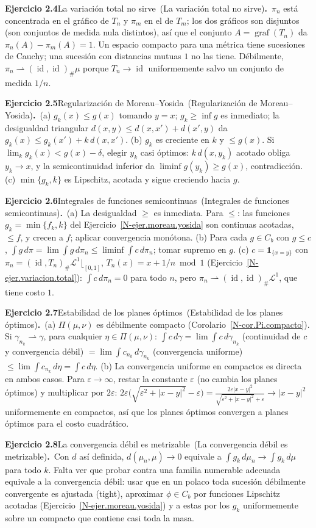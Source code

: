 \documentclass[11pt,a4paper]{amsart}
\newcommand{\id}{\operatorname{id}}
\newcommand{\ve}{\varepsilon}
\newcommand{\LL}{{\mathcal L}}
\newcommand{\I}{{\mathbf 1}}
\theoremstyle{remark}
\theoremstyle{definition}
\numberwithin{subsection}{section}
\numberwithin{equation}{section}
\newcommand{\ejlabel}[2]{\par\medskip\noindent\textbf{Ejercicio #1}\ifx\relax#2\relax\else\ (#2)\fi\textbf{.}\ }
\begin{document}
\ejlabel{2.4}{La variación total no sirve}$\pi_n$ está concentrada en el gráfico de $T_n$ y $\pi_m$ en el de $T_m$; los dos gráficos son disjuntos (son conjuntos de medida nula distintos), así que el conjunto $A=\operatorname{graf}(T_n)$ da $\pi_n(A)-\pi_m(A)=1$. Un espacio compacto para una métrica tiene sucesiones de Cauchy; una sucesión con distancias mutuas $1$ no las tiene. Débilmente, $\pi_n\rightharpoonup(\id,\id)_\#\mu$ porque $T_n\to\id$ uniformemente salvo un conjunto de medida $1/n$.

\ejlabel{2.5}{Regularización de Moreau--Yosida}(a) $g_k(x)\le g(x)$ tomando $y=x$; $g_k\ge\inf g$ es inmediato; la desigualdad triangular $d(x,y)\le d(x,x')+d(x',y)$ da $g_k(x)\le g_k(x')+k\,d(x,x')$. (b) $g_k$ es creciente en $k$ y $\le g(x)$. Si $\lim_kg_k(x)<g(x)-\delta$, elegir $y_k$ casi óptimos: $k\,d(x,y_k)$ acotado obliga $y_k\to x$, y la semicontinuidad inferior da $\liminf g(y_k)\ge g(x)$, contradicción. (c) $\min\{g_k,k\}$ es Lipschitz, acotada y sigue creciendo hacia $g$.

\ejlabel{2.6}{Integrales de funciones semicontinuas}(a) La desigualdad $\ge$ es inmediata. Para $\le$: las funciones $g_k=\min\{f_k,k\}$ del Ejercicio~\ref{N-ejer.moreau.yosida} son continuas acotadas, $\le f$, y crecen a $f$; aplicar convergencia monótona. (b) Para cada $g\in C_b$ con $g\le c$, $\int g\,d\pi=\lim\int g\,d\pi_n\le\liminf\int c\,d\pi_n$; tomar supremo en $g$. (c) $c=\I_{\{x=y\}}$ con $\pi_n=(\id,T_n)_\#\LL^1\lfloor_{[0,1]}$, $T_n(x)=x+1/n \bmod 1$ (Ejercicio~\ref{N-ejer.variacion.total}): $\int c\,d\pi_n=0$ para todo $n$, pero $\pi_n\rightharpoonup(\id,\id)_\#\LL^1$, que tiene costo $1$.

\ejlabel{2.7}{Estabilidad de los planes óptimos}(a) $\Pi(\mu,\nu)$ es débilmente compacto (Corolario~\ref{N-cor.Pi.compacto}). Si $\gamma_{n_k}\rightharpoonup\gamma$, para cualquier $\eta\in\Pi(\mu,\nu)$: $\int c\,d\gamma=\lim\int c\,d\gamma_{n_k}$ (continuidad de $c$ y convergencia débil) $=\lim\int c_{n_k}\,d\gamma_{n_k}$ (convergencia uniforme) $\le\lim\int c_{n_k}\,d\eta=\int c\,d\eta$. (b) La convergencia uniforme en compactos es directa en ambos casos. Para $\ve\to\infty$, restar la constante $\ve$ (no cambia los planes óptimos) y multiplicar por $2\ve$: $2\ve\bigl(\sqrt{\ve^2+|x-y|^2}-\ve\bigr)=\frac{2\ve|x-y|^2}{\sqrt{\ve^2+|x-y|^2}+\ve}\to|x-y|^2$ uniformemente en compactos, así que los planes óptimos convergen a planes óptimos para el costo cuadrático.

\ejlabel{2.8}{La convergencia débil es metrizable}Con $d$ así definida, $d(\mu_n,\mu)\to0$ equivale a $\int g_k\,d\mu_n\to\int g_k\,d\mu$ para todo $k$. Falta ver que probar contra una familia numerable adecuada equivale a la convergencia débil: usar que en un polaco toda sucesión débilmente convergente es ajustada (tight), aproximar $\phi\in C_b$ por funciones Lipschitz acotadas (Ejercicio~\ref{N-ejer.moreau.yosida}) y a estas por los $g_k$ uniformemente sobre un compacto que contiene casi toda la masa.
\end{document}
